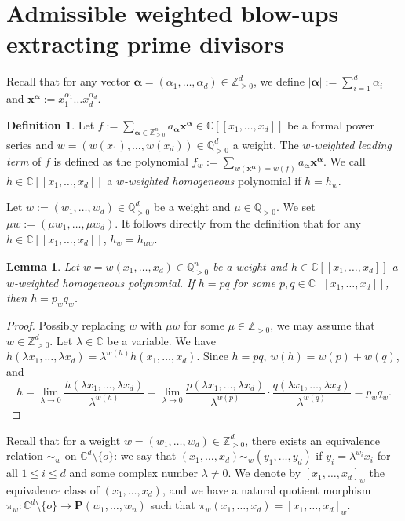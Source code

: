 \documentclass[11pt]{amsart}
\numberwithin{equation}{section}
\newcommand\luo[1]{\todo[color=red!40]{#1}} %
\newcommand{\Cc}{\mathbb{C}}
\newcommand{\Qq}{\mathbb{Q}}
\newcommand{\Zz}{\mathbb{Z}}
\newtheorem{lem}[thm]{Lemma}
\theoremstyle{definition}
\theoremstyle{definition}
\newtheorem{defn}[thm]{Definition}
\begin{document}
\section{Admissible weighted blow-ups extracting prime divisors}


Recall that for any vector $\bm{\alpha}=(\alpha_1,\dots, \alpha_d)\in \Zz_{\geq 0}^d$, we define $|\bm{\alpha}|:=\sum_{i=1}^d\alpha_i$ and $\bm{x}^{\bm{\alpha}} :=x_1^{\alpha_1}\dots x_d^{\alpha_d}$.


\begin{defn}\label{def: w-weighted leading term} Let $f:=\sum_{\bm{\alpha}\in \Zz^n_{\geq 0}} a_{\bm{\alpha}} \bm{x}^{\bm{\alpha}}\in \Cc[[x_1,\dots,x_d]]$ be a formal power series and $w=(w(x_1),\dots,w(x_d))\in \Qq^d_{> 0}$ a weight. The \emph{$w$-weighted leading term} of $f$ is defined as the polynomial $f_w:=\sum_{w(\bm{x}^{\bm{\alpha}})=w(f)} a_{\bm{\alpha}}\bm{x}^{\bm{\alpha}}$. We call $h\in \Cc[[x_1,\dots,x_d]]$ a \emph{$w$-weighted homogeneous} polynomial if $h=h_w$.
\end{defn}

Let $w:=(w_1,\dots,w_d)\in \Qq_{>0}^d$ be a weight and $\mu\in \Qq_{>0}$. We set $\mu w:=(\mu w_1,\dots,\mu w_d)$. It follows directly from the definition that for any $h\in \Cc[[x_1,\dots,x_d]]$, $h_{w}=h_{\mu w}$.

\begin{lem}\label{lem: product rule for w-weighted leading term}
Let $w=w(x_1,\dots,x_d)\in \Qq_{>0}^n$ be a weight and $h\in \Cc[[x_1,\dots,x_d]]$ a $w$-weighted homogeneous polynomial. If $h=p q$ for some $p,q\in \Cc[[x_1,\dots,x_d]]$, then $h=p_wq_w$.
\end{lem}

\begin{proof}
Possibly replacing $w$ with $\mu w$ for some $\mu\in \Zz_{>0}$, we may assume that $w\in \Zz_{>0}^d$. Let $\lambda\in \Cc$ be a variable. We have $h(\lambda x_1,\dots,\lambda x_d)=\lambda^{w(h)}h(x_1,\dots,x_d)$. Since $h=pq$, $w(h)=w(p)+w(q)$, and
$$    h=\lim_{\lambda\to 0}\frac{h(\lambda x_1,\dots,\lambda x_d)}{\lambda^{w(h)}}=\lim_{\lambda\to 0}\frac{p(\lambda x_1,\dots,\lambda x_d)}{\lambda^{w(p)}}\cdot \frac{q(\lambda x_1,\dots,\lambda x_d)}{\lambda^{w(q)}}=p_wq_w.$$
\end{proof}


Recall that for a weight $w=(w_1,\dots,w_d)\in \Zz^d_{>0}$, there exists an equivalence relation $\sim_w$ on $\Cc^d\setminus \{o\}$: we say that $(x_1,\dots,x_d)\sim_w (y_1,\dots,y_d)$ if $y_i=\lambda^{w_i}x_i$ for all $1\leq i\leq d$ and some complex number $\lambda\neq 0$. We denote by $[x_1,\dots,x_d]_w$ the equivalence class of $(x_1,\dots,x_d)$, and we have a natural quotient morphism $\pi_w: \Cc^d\setminus\{o\}\to \mathbf{P}(w_1,\dots,w_n)$ such that $\pi_w(x_1,\dots,x_d)=[x_1,\dots,x_d]_w$.
\end{document}
